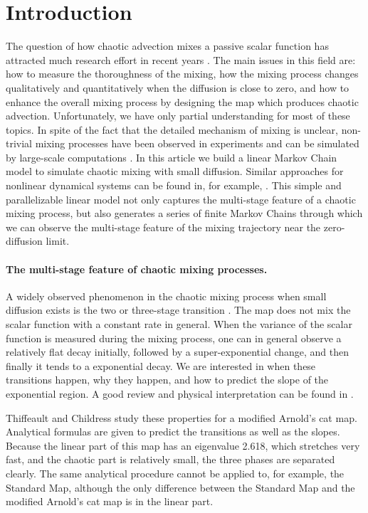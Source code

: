 %
%
\section{Introduction}
\label{sec:numcutoffintro}

The question of how chaotic advection mixes a passive scalar function
has attracted much research effort in recent years
\cite{Ottino2004}. The main issues in this field are: how to measure
the thoroughness of the mixing, how the mixing process changes
qualitatively and quantitatively when the diffusion is close to zero,
and how to enhance the overall mixing process by designing the map
which produces chaotic advection. Unfortunately, we have only partial
understanding for most of these topics. In spite of the fact that the
detailed mechanism of mixing is unclear, non-trivial mixing processes
have been observed in experiments \cite{Rothstein1999, Voth2002} and
can be simulated by large-scale computations \cite{topopt,
  Tsang2005}. In this article we build a linear Markov Chain model to
simulate chaotic mixing with small diffusion. Similar approaches for
nonlinear dynamical systems can be found in, for example,
\cite{Dellnitz1999, Dellnitz2002, Froyland1998, Froyland1999,
  Froyland2001} . This simple and parallelizable linear model not only
captures the multi-stage feature of a chaotic mixing process, but also
generates a series of finite Markov Chains through which we can
observe the multi-stage feature of the mixing trajectory near the
zero-diffusion limit.

\paragraph{The multi-stage feature of chaotic mixing processes.}
A widely observed phenomenon in the chaotic mixing process when small
diffusion exists is the two or three-stage transition
\cite{Thiffeault2003-13, Fereday2002, Antonsen1996, Mezic2005}. The
map does not mix the scalar function with a constant rate in
general. When the variance of the scalar function is measured during
the mixing process, one can in general observe a relatively flat decay
initially, followed by a super-exponential change, and then finally it
tends to a exponential decay. We are interested in when these
transitions happen, why they happen, and how to predict the slope of
the exponential region. A good review and physical interpretation can
be found in \cite{Thiffeault2004}.

Thiffeault and Childress \cite{Thiffeault2003-13} study these
properties for a modified Arnold's cat map. Analytical formulas are
given to predict the transitions as well as the slopes. Because the
linear part of this map has an eigenvalue 2.618, which stretches very fast, 
and the chaotic part is relatively small, the three phases are
separated clearly. The same analytical procedure cannot be applied to,
for example, the Standard Map, although the only difference between the
Standard Map and the modified Arnold's cat map is in the linear part.

